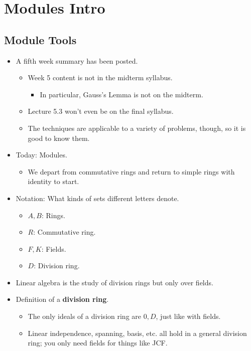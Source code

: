 \documentclass[../notes.tex]{subfiles}
\begin{document}
\chapter{Modules Intro}
\section{Module Tools}
\begin{itemize}
    \item {}A fifth week summary has been posted.
    \begin{itemize}
        \item Week 5 content is not in the midterm syllabus.
        \begin{itemize}
            \item In particular, Gauss's Lemma is not on the midterm.
        \end{itemize}
        \item Lecture 5.3 won't even be on the final syllabus.
        \item The techniques are applicable to a variety of problems, though, so it is good to know them.
    \end{itemize}
    \item Today: Modules.
    \begin{itemize}
        \item We depart from commutative rings and return to simple rings with identity to start.
    \end{itemize}
    \item Notation: What kinds of sets different letters denote.
    \begin{itemize}
        \item $A,B$: Rings.
        \item $R$: Commutative ring.
        \item $F,K$: Fields.
        \item $D$: Division ring.
    \end{itemize}
    \item Linear algebra is the study of division rings but only over fields.
    \item Definition of a \textbf{division ring}.
    \begin{itemize}
        \item The only ideals of a division ring are $0,D$, just like with fields.
        \item Linear independence, spanning, basis, etc. all hold in a general division ring; you only need fields for things like JCF.

\end{itemize}
\end{itemize}
\end{document}
